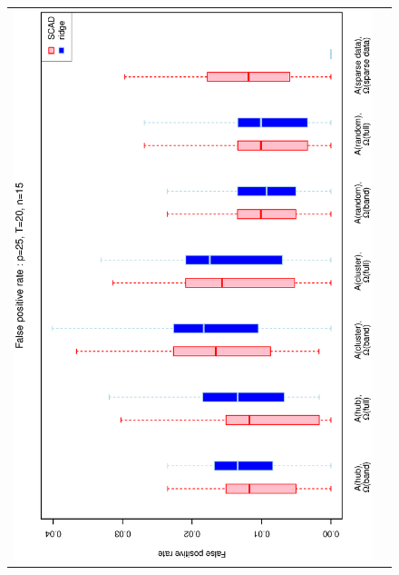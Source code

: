 \documentclass[a4paper]{article}
\begin{document}
\begin{figure}[h!]
\centering
\begin{tabular}{cc}
\includegraphics[scale=0.5,angle=270]{ROCfpr25T20N15a.eps}\\

\end{tabular}
\end{figure}
\end{document}

